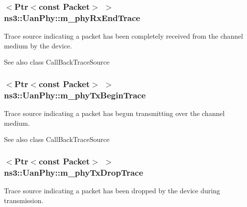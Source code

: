 \subsubsection[{\texorpdfstring{m\+\_\+phy\+Rx\+End\+Trace}{m_phyRxEndTrace}}]{$<${\bf Ptr}$<$const {\bf Packet}$>$ $>$ ns3\+::\+Uan\+Phy\+::m\+\_\+phy\+Rx\+End\+Trace\hspace{0.3cm}{\ttfamily [private]}}\hypertarget{classns3_1_1UanPhy_a6bbe64c9f06cc631da4824066eb79e16}{}\label{classns3_1_1UanPhy_a6bbe64c9f06cc631da4824066eb79e16}
Trace source indicating a packet has been completely received from the channel medium by the device.

\begin{DoxySeeAlso}{See also}
class Call\+Back\+Trace\+Source 
\end{DoxySeeAlso}
\subsubsection[{\texorpdfstring{m\+\_\+phy\+Tx\+Begin\+Trace}{m_phyTxBeginTrace}}]{$<${\bf Ptr}$<$const {\bf Packet}$>$ $>$ ns3\+::\+Uan\+Phy\+::m\+\_\+phy\+Tx\+Begin\+Trace\hspace{0.3cm}{\ttfamily [private]}}\hypertarget{classns3_1_1UanPhy_ab6c9ef4e39580603d38b957061e0dd93}{}\label{classns3_1_1UanPhy_ab6c9ef4e39580603d38b957061e0dd93}
Trace source indicating a packet has begun transmitting over the channel medium.

\begin{DoxySeeAlso}{See also}
class Call\+Back\+Trace\+Source 
\end{DoxySeeAlso}
\subsubsection[{\texorpdfstring{m\+\_\+phy\+Tx\+Drop\+Trace}{m_phyTxDropTrace}}]{$<${\bf Ptr}$<$const {\bf Packet}$>$ $>$ ns3\+::\+Uan\+Phy\+::m\+\_\+phy\+Tx\+Drop\+Trace\hspace{0.3cm}{\ttfamily [private]}}\hypertarget{classns3_1_1UanPhy_a5fae11ade758fd7e20b21d90faadc959}{}\label{classns3_1_1UanPhy_a5fae11ade758fd7e20b21d90faadc959}
Trace source indicating a packet has been dropped by the device during transmission.

